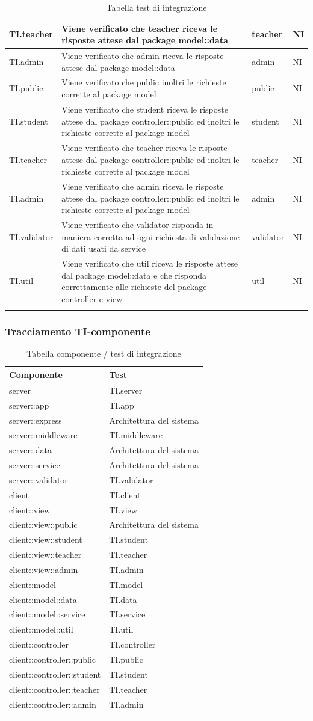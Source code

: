 \documentclass[12pt,a4paper]{article}
\begin{document}
\begin{longtable}{l p{6cm} l l}
		\midrule
		TI.teacher & Viene verificato che teacher riceva le risposte attese dal package model::data & teacher & NI\tabularnewline
		\midrule
		TI.admin & Viene verificato che admin riceva le risposte attese dal package model::data & admin & NI\tabularnewline
		\midrule
		TI.public & Viene verificato che public inoltri le richieste corrette al package model & public & NI\tabularnewline
		\midrule
		TI.student & Viene verificato che student riceva le risposte attese dal package controller::public ed inoltri le richieste corrette al package model & student & NI\tabularnewline
		\midrule
		TI.teacher & Viene verificato che teacher riceva le risposte attese dal package controller::public ed inoltri le richieste corrette al package model & teacher & NI\tabularnewline
		\midrule
		TI.admin & Viene verificato che admin riceva le risposte attese dal package controller::public ed inoltri le richieste corrette al package model & admin & NI\tabularnewline
		\midrule
		TI.validator & Viene verificato che validator risponda in maniera corretta ad ogni richiesta di validazione di dati usati da service & validator & NI\tabularnewline
		\midrule
		TI.util & Viene verificato che util riceva le risposte attese dal package model::data e che risponda correttamente alle richieste del package controller e view & util & NI\tabularnewline
		\midrule
		\caption{Tabella test di integrazione} \tabularnewline
	\end{longtable}
	\subsubsection{Tracciamento TI-componente}
	\begin{longtable}{l l}
		\midrule
		Componente & Test\tabularnewline
		\midrule
		\midrule
		server & TI.server\tabularnewline
		\midrule
		server::app & TI.app\tabularnewline
		\midrule
		server::express & Architettura del sistema\tabularnewline
		\midrule
		server::middleware & TI.middleware\tabularnewline
		\midrule
		server::data & Architettura del sistema\tabularnewline
		\midrule
		server::service & Architettura del sistema\tabularnewline
		\midrule
		server::validator & TI.validator\tabularnewline
		\midrule
		client & TI.client\tabularnewline
		\midrule
		client::view & TI.view\tabularnewline
		\midrule
		client::view::public & Architettura del sistema\tabularnewline
		\midrule
		client::view::student & TI.student\tabularnewline
		\midrule
		client::view::teacher & TI.teacher\tabularnewline
		\midrule
		client::view::admin & TI.admin\tabularnewline
		\midrule
		client::model & TI.model\tabularnewline
		\midrule
		client::model::data & TI.data\tabularnewline
		\midrule
		client::model::service & TI.service\tabularnewline
		\midrule
		client::model::util & TI.util\tabularnewline
		\midrule
		client::controller & TI.controller\tabularnewline
		\midrule
		client::controller::public & TI.public\tabularnewline
		\midrule
		client::controller::student & TI.student\tabularnewline
		\midrule
		client::controller::teacher & TI.teacher\tabularnewline
		\midrule
		client::controller::admin & TI.admin\tabularnewline
		\midrule
		\caption{Tabella componente / test di integrazione} \tabularnewline
	\end{longtable}
	
\end{document}
